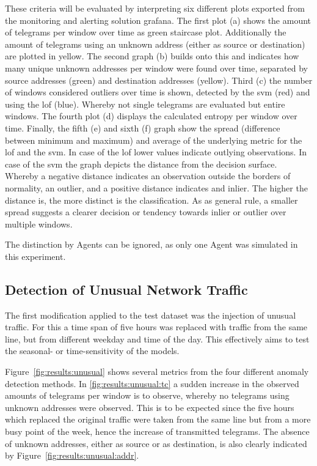 These criteria will be evaluated by interpreting six different plots exported from the monitoring and alerting solution \gls{grafana}.
The first plot (a) shows the amount of telegrams per window over time as green staircase plot. Additionally the amount of telegrams using an unknown address (either as source or destination) are plotted in yellow.
The second graph (b) builds onto this and indicates how many unique unknown addresses per window were found over time, separated by source addresses (green) and destination addresses (yellow).
Third (c) the number of windows considered outliers over time is shown, detected by the \gls{svm} (red) and using the \gls{lof} (blue). Whereby not single telegrams are evaluated but entire windows.
The fourth plot (d) displays the calculated entropy per window over time.
Finally, the fifth (e) and sixth (f) graph show the spread (difference between minimum and maximum) and average of the underlying metric for the \gls{lof} and the \gls{svm}.
In case of the \gls{lof} lower values indicate outlying observations. In case of the \gls{svm} the graph depicts the distance from the decision surface. Whereby a negative distance indicates an observation outside the borders of normality, an outlier, and a positive distance indicates and inlier. The higher the distance is, the more distinct is the classification.
As as general rule, a smaller spread suggests a clearer decision or tendency towards inlier or outlier over multiple windows.

The distinction by Agents can be ignored, as only one Agent was simulated in this experiment. 

\subsection{Detection of Unusual Network Traffic}
\label{sec:results:results:unusual}

The first modification applied to the test dataset was the injection of unusual traffic. 
For this a time span of five hours was replaced with traffic from the same line, but from different weekday and time of the day.
This effectively aims to test the seasonal- or time-sensitivity of the models.

Figure~\ref{fig:results:unusual} shows several metrics from the four different anomaly detection methods.
In \ref{fig:results:unusual:tc} a sudden increase in the observed amounts of telegrams per window is to observe, whereby no telegrams using unknown addresses were observed. This is to be expected since the five hours which replaced the original traffic were taken from the same line but from a more busy point of the week, hence the increase of transmitted telegrams.
The absence of unknown addresses, either as source or as destination, is also clearly indicated by Figure~\ref{fig:results:unusual:addr}.

